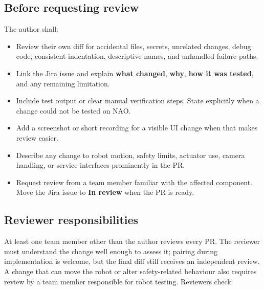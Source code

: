 \documentclass[12pt,a4paper]{article}
\begin{document}
\subsection{Before requesting review}

The author shall:

\begin{itemize}

\item Review their own diff for accidental files, secrets, unrelated changes, debug code, consistent indentation, descriptive names, and unhandled failure paths.

\item Link the Jira issue and explain \textbf{what changed}, \textbf{why}, \textbf{how it was tested}, and any remaining limitation.

\item Include test output or clear manual verification steps. State explicitly when a change could not be tested on NAO.

\item Add a screenshot or short recording for a visible UI change when that makes review easier.

\item Describe any change to robot motion, safety limits, actuator use, camera handling, or service interfaces prominently in the PR.

\item Request review from a team member familiar with the affected component. Move the Jira issue to \textbf{In review} when the PR is ready.

\end{itemize}

\subsection{Reviewer responsibilities}

At least one team member other than the author reviews every PR. The reviewer must understand the change well enough to assess it; pairing during implementation is welcome, but the final diff still receives an independent review. A change that can move the robot or alter safety-related behaviour also requires review by a team member responsible for robot testing. Reviewers check:
\end{document}
